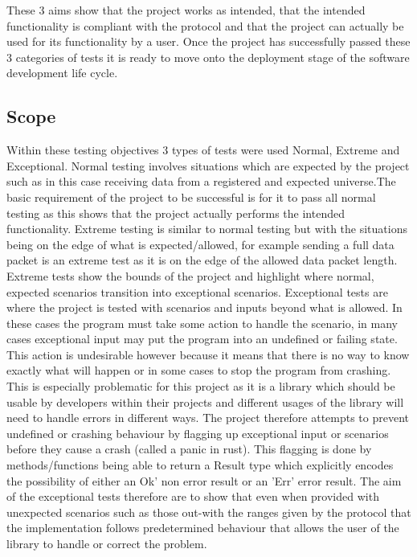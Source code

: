 \documentclass[11pt,a4paper]{article}
\begin{document}
These 3 aims show that the project works as intended, that the intended functionality is compliant with the protocol and that the project can actually be used for its functionality by a user. Once the project has successfully passed these 3 categories of tests it is ready to move onto the deployment stage of the software development life cycle.

\subsection{Scope}
Within these testing objectives 3 types of tests were used Normal, Extreme and Exceptional. Normal testing involves situations which are expected by the project such as in this case receiving data from a registered and expected universe.The basic requirement of the project to be successful is for it to pass all normal testing as this shows that the project actually performs the intended functionality. Extreme testing is similar to normal testing but with the situations being on the edge of what is expected/allowed, for example sending a full data packet is an extreme test as it is on the edge of the allowed data packet length. Extreme tests show the bounds of the project and highlight where normal, expected scenarios transition into exceptional scenarios. Exceptional tests are where the project is tested with scenarios and inputs beyond what is allowed. In these cases the program must take some action to handle the scenario, in many cases exceptional input may put the program into an undefined or failing state. This action is undesirable however because it means that there is no way to know exactly what will happen or in some cases to stop the program from crashing. This is especially problematic for this project as it is a library which should be usable by developers within their projects and different usages of the library will need to handle errors in different ways. The project therefore attempts to prevent undefined or crashing behaviour by flagging up exceptional input or scenarios before they cause a crash (called a panic in rust). This flagging is done by methods/functions being able to return a Result type which explicitly encodes the possibility of either an Ok' non error result or an 'Err' error result. The aim of the exceptional tests therefore are to show that even when provided with unexpected scenarios such as those out-with the ranges given by the protocol that the implementation follows predetermined behaviour that allows the user of the library to handle or correct the problem.\\
\end{document}
